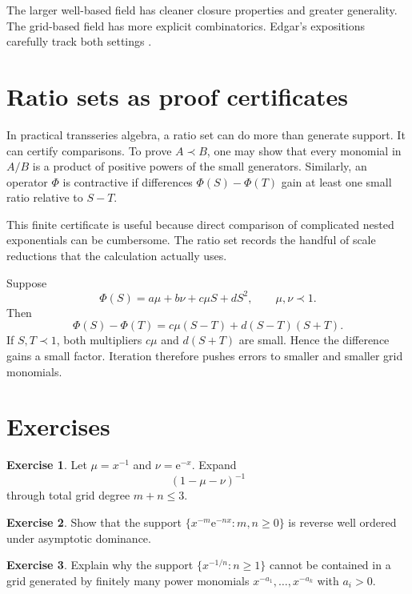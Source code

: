 \documentclass[11pt,openany]{book}
\theoremstyle{definition}
\newtheorem{exercise}{Exercise}[chapter]
\theoremstyle{plain}
\theoremstyle{remark}
\newcommand{\e}{\mathrm{e}}
\newcommand{\precdom}{\prec}
\begin{document}
The larger well-based field has cleaner closure properties and greater generality. The grid-based field has more explicit combinatorics. Edgar's expositions carefully track both settings \cite{edgar-beginners,edgar-composition}.

\section{Ratio sets as proof certificates}

In practical transseries algebra, a ratio set can do more than generate support. It can certify comparisons. To prove $A\precdom B$, one may show that every monomial in $A/B$ is a product of positive powers of the small generators. Similarly, an operator $\Phi$ is contractive if differences $\Phi(S)-\Phi(T)$ gain at least one small ratio relative to $S-T$.

This finite certificate is useful because direct comparison of complicated nested exponentials can be cumbersome. The ratio set records the handful of scale reductions that the calculation actually uses.

\begin{workedbox}
Suppose
\[
 \Phi(S)=a\mu+b\nu+c\mu S+dS^2,
 \qquad \mu,\nu\precdom1.
\]
Then
\[
 \Phi(S)-\Phi(T)
 =c\mu(S-T)+d(S-T)(S+T).
\]
If $S,T\precdom1$, both multipliers $c\mu$ and $d(S+T)$ are small. Hence the difference gains a small factor. Iteration therefore pushes errors to smaller and smaller grid monomials.
\end{workedbox}

\section{Exercises}

\begin{exercise}
Let $\mu=x^{-1}$ and $\nu=\e^{-x}$. Expand
\[
 (1-\mu-\nu)^{-1}
\]
through total grid degree $m+n\le3$.
\end{exercise}

\begin{exercise}
Show that the support $\{x^{-m}\e^{-nx}:m,n\ge0\}$ is reverse well ordered under asymptotic dominance.
\end{exercise}

\begin{exercise}
Explain why the support $\{x^{-1/n}:n\ge1\}$ cannot be contained in a grid generated by finitely many power monomials $x^{-a_1},\ldots,x^{-a_k}$ with $a_i>0$.
\end{exercise}
\end{document}
